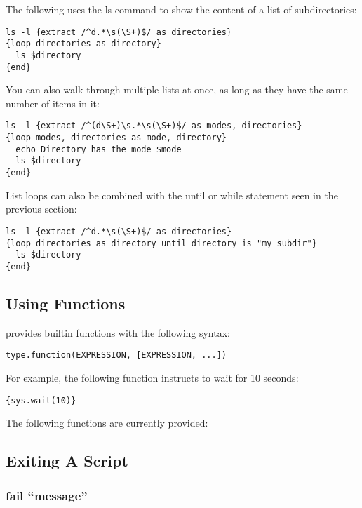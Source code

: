 The following \product uses the ls command to show the content of a list 
of subdirectories: 

\begin{lstlisting}
ls -l {extract /^d.*\s(\S+)$/ as directories}
{loop directories as directory}
  ls $directory
{end}
\end{lstlisting}

You can also walk through multiple lists at once, as long as they have the 
same number of items in it: 

\begin{lstlisting}
ls -l {extract /^(d\S+)\s.*\s(\S+)$/ as modes, directories}
{loop modes, directories as mode, directory}
  echo Directory has the mode $mode
  ls $directory
{end}
\end{lstlisting}

List loops can also be combined with the until or while statement seen in 
the previous section: 

\begin{lstlisting}
ls -l {extract /^d.*\s(\S+)$/ as directories}
{loop directories as directory until directory is "my_subdir"}
  ls $directory
{end}
\end{lstlisting}


\subsection{Using Functions}

\product provides builtin functions with the following syntax: 

\begin{lstlisting}
type.function(EXPRESSION, [EXPRESSION, ...])
\end{lstlisting}

For example, the following function instructs \product to wait for 10 seconds: 

\begin{lstlisting}
{sys.wait(10)}
\end{lstlisting}

The following functions are currently provided: 




\subsection{Exiting A Script}

\subsubsection{fail ``message''}

